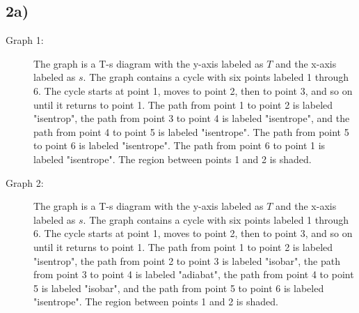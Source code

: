 

\subsection*{2a)}

\begin{description}
    \item[Graph 1:] The graph is a T-s diagram with the y-axis labeled as \( T \) and the x-axis labeled as \( s \). The graph contains a cycle with six points labeled 1 through 6. The cycle starts at point 1, moves to point 2, then to point 3, and so on until it returns to point 1. The path from point 1 to point 2 is labeled "isentrop", the path from point 3 to point 4 is labeled "isentrope", and the path from point 4 to point 5 is labeled "isentrope". The path from point 5 to point 6 is labeled "isentrope". The path from point 6 to point 1 is labeled "isentrope". The region between points 1 and 2 is shaded.
    \item[Graph 2:] The graph is a T-s diagram with the y-axis labeled as \( T \) and the x-axis labeled as \( s \). The graph contains a cycle with six points labeled 1 through 6. The cycle starts at point 1, moves to point 2, then to point 3, and so on until it returns to point 1. The path from point 1 to point 2 is labeled "isentrop", the path from point 2 to point 3 is labeled "isobar", the path from point 3 to point 4 is labeled "adiabat", the path from point 4 to point 5 is labeled "isobar", and the path from point 5 to point 6 is labeled "isentrope". The region between points 1 and 2 is shaded.
\end{description}